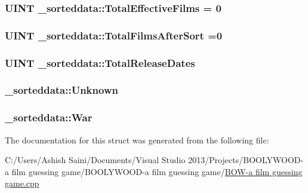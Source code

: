 \subsubsection[{Total\+Effective\+Films}]{\setlength{\rightskip}{0pt plus 5cm}U\+I\+N\+T \+\_\+sorteddata\+::\+Total\+Effective\+Films = 0}\label{struct__sorteddata_aa4043574ded74858a03e1ba566ee3fbc}
\hypertarget{struct__sorteddata_a10b08ddd063b34d1c330da1ec3587d3f}{}
\subsubsection[{Total\+Films\+After\+Sort}]{\setlength{\rightskip}{0pt plus 5cm}U\+I\+N\+T \+\_\+sorteddata\+::\+Total\+Films\+After\+Sort =0}\label{struct__sorteddata_a10b08ddd063b34d1c330da1ec3587d3f}
\hypertarget{struct__sorteddata_a4d14c3c8abf8b96979e12566359040da}{}
\subsubsection[{Total\+Release\+Dates}]{\setlength{\rightskip}{0pt plus 5cm}U\+I\+N\+T \+\_\+sorteddata\+::\+Total\+Release\+Dates}\label{struct__sorteddata_a4d14c3c8abf8b96979e12566359040da}
\hypertarget{struct__sorteddata_a484257a5713abf7206eea555272393f0}{}
\subsubsection[{Unknown}]{ \+\_\+sorteddata\+::\+Unknown}\label{struct__sorteddata_a484257a5713abf7206eea555272393f0}
\hypertarget{struct__sorteddata_a7fa587f3d0e3ffba53c3e4d122396448}{}
\subsubsection[{War}]{ \+\_\+sorteddata\+::\+War}\label{struct__sorteddata_a7fa587f3d0e3ffba53c3e4d122396448}


The documentation for this struct was generated from the following file\+:\begin{DoxyCompactItemize}
\item 
C\+:/\+Users/\+Ashish Saini/\+Documents/\+Visual Studio 2013/\+Projects/\+B\+O\+O\+L\+Y\+W\+O\+O\+D-\/a film guessing game/\+B\+O\+O\+L\+Y\+W\+O\+O\+D-\/a film guessing game/\hyperlink{_b_o_w-a_01film_01guessing_01game_8cpp}{B\+O\+W-\/a film guessing game.\+cpp}\end{DoxyCompactItemize}
